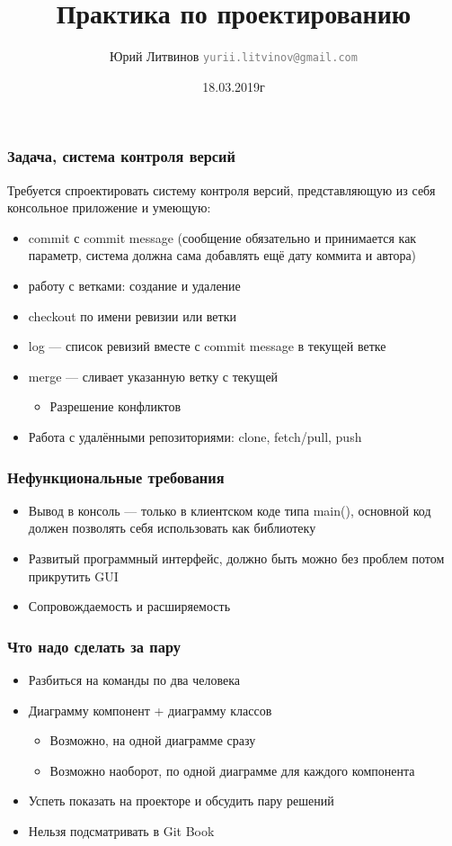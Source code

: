 \documentclass[xetex,mathserif,serif]{beamer}
\title{Практика по проектированию}
\author[Юрий Литвинов]{Юрий Литвинов \newline \textcolor{gray}{\small\texttt{yurii.litvinov@gmail.com}}}
\date{18.03.2019г}
\begin{document}
	
	\frame{\titlepage}

	\begin{frame}
		\frametitle{Задача, система контроля версий}
		Требуется спроектировать систему контроля версий, представляющую из себя консольное приложение и умеющую:
		\begin{itemize}
			\item commit с commit message (сообщение обязательно и принимается как параметр, система должна сама добавлять ещё дату коммита и автора)
			\item работу с ветками: создание и удаление
			\item checkout по имени ревизии или ветки
			\item log --- список ревизий вместе с commit message в текущей ветке
			\item merge --- сливает указанную ветку с текущей
			\begin{itemize}
				\item Разрешение конфликтов
			\end{itemize}
			\item Работа с удалёнными репозиториями: clone, fetch/pull, push
		\end{itemize}
	\end{frame}

	\begin{frame}
		\frametitle{Нефункциональные требования}
		\begin{itemize}
			\item Вывод в консоль --- только в клиентском коде типа main(), основной код должен позволять себя использовать как библиотеку
			\item Развитый программный интерфейс, должно быть можно без проблем потом прикрутить GUI
			\item Сопровождаемость и расширяемость
		\end{itemize}
	\end{frame}

	\begin{frame}
		\frametitle{Что надо сделать за пару}
		\begin{itemize}
			\item Разбиться на команды по два человека
			\item Диаграмму компонент + диаграмму классов
			\begin{itemize}
				\item Возможно, на одной диаграмме сразу
				\item Возможно наоборот, по одной диаграмме для каждого компонента
			\end{itemize}
			\item Успеть показать на проекторе и обсудить пару решений
			\item Нельзя подсматривать в Git Book
		\end{itemize}
	\end{frame}
\end{document}
